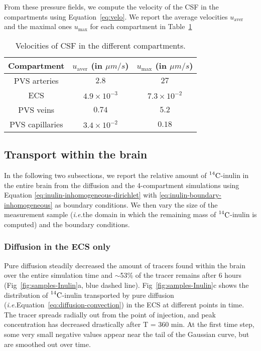 \documentclass[10pt]{article}
\newcommand{\ie}{\emph{i.e.}\;}
\newcommand{\1}{^{(1)}}
\newcommand{\2}{^{(2)}}
\newcommand{\Cinulin}{$\prescript{14}{}{\text{C}}$-inulin }
\begin{document}
From these pressure fields, we compute the velocity of the CSF in the compartments using Equation~\eqref{eq:velo}. We report the average velocities $u_\text{aver}$ and the maximal ones $u_\text{max}$ for each compartment in Table~\ref{tab:velocities-baseline}

\begin{table}[]
    \centering
    \begin{tabular}{c|c|c}
       Compartment & $u_\text{aver}$ (in $\si{\mu m/s}$) & $u_\text{max}$ (in $\si{\mu m/s}$) \\
       \hline

        PVS arteries & $2.8$ & $27$ \\
        ECS &  $4.9\times 10^{-3}$ & $7.3 \times 10^{-2}$ \\
        PVS veins & $0.74$ & $5.2$ \\
        PVS capillaries & $3.4\times 10^{-2}$ & $0.18$
    \end{tabular}
    \caption{Velocities of CSF in the different compartments.}
    \label{tab:velocities-baseline}
\end{table}

\subsection{Transport within the brain}
In the following two subsections, we report the relative amount of \Cinulin in the entire brain from the diffusion and the 4-compartment simulations using Equation \eqref{eq:inulin-inhomogeneous-dirichlet} with \eqref{eq:inulin-boundary-inhomogeneous} as boundary conditions. We then vary the size of the measurement sample (\ie the domain in which the remaining mass of \Cinulin is computed) and the boundary conditions. 
\subsubsection{Diffusion in the ECS only}
Pure diffusion steadily decreased the amount of tracers found within the brain over the entire simulation time and $\sim$53\% of the tracer remains after 6 hours (Fig~\ref{fig:samples-Inulin}a, blue dashed line). Fig~\ref{fig:samples-Inulin}c shows the distribution of \Cinulin transported by pure diffusion (\ie Equation~\eqref{eq:diffusion-convection}) in the ECS at different points in time. The tracer spreads radially out from the point of injection, and peak concentration has decreased drastically after T = 360 min. At the first time step, some very small negative values appear near the tail of the Gaussian curve, but are smoothed out over time. 
\end{document}
